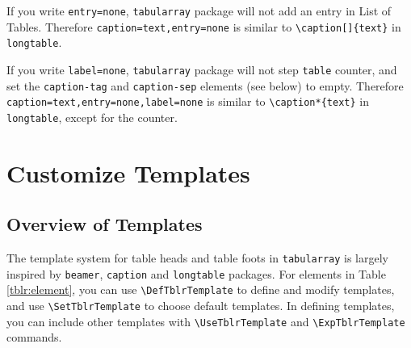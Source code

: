 \documentclass[oneside]{book}
\begin{document}
If you write \verb!entry=none!, \verb!tabularray! package will not add an entry in List of Tables.
Therefore \verb!caption=text,entry=none! is similar to \verb!\caption[]{text}! in \verb!longtable!.

If you write \verb!label=none!, \verb!tabularray! package will not step \verb!table! counter,
and set the \verb!caption-tag! and \verb!caption-sep! elements (see below) to empty.
Therefore \verb!caption=text,entry=none,label=none! is similar to \verb!\caption*{text}!
in \verb!longtable!, except for the counter.

\section{Customize Templates}

\subsection{Overview of Templates}

The template system for table heads and table foots in \verb!tabularray! is largely inspired
by \verb!beamer!, \verb!caption! and \verb!longtable! packages. For elements in Table \ref{tblr:element},
you can use \verb!\DefTblrTemplate! to define and modify templates,
and use \verb!\SetTblrTemplate! to choose default templates. In defining templates,
you can include other templates with \verb!\UseTblrTemplate! and \verb!\ExpTblrTemplate! commands.
\end{document}
